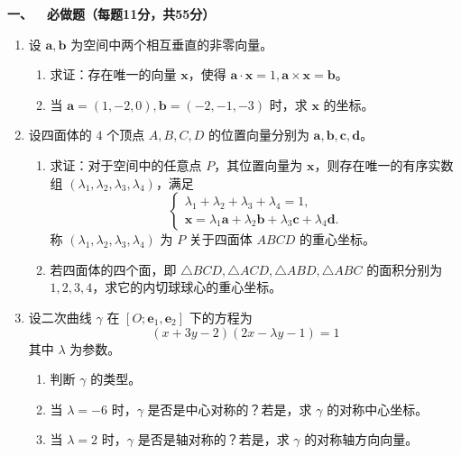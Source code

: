 \textbf{一、\ \ 必做题（每题11分，共55分）}
\begin{enumerate}
    \item 设 $\boldsymbol{a}, \boldsymbol{b}$ 为空间中两个相互垂直的非零向量。
    \begin{enumerate}
        \item[(a)] 求证：存在唯一的向量 $\boldsymbol{x}$，使得 $\boldsymbol{a}\cdot \boldsymbol{x}=1, \boldsymbol{a}\times \boldsymbol{x}=\boldsymbol{b}$。
        \item[(b)] 当 $\boldsymbol{a}=(1,-2,0), \boldsymbol{b}=(-2,-1,-3)$ 时，求 $\boldsymbol{x}$ 的坐标。
    \end{enumerate}

    \item 设四面体的 $4$ 个顶点 $A,B,C,D$ 的位置向量分别为 $\boldsymbol{a}, \boldsymbol{b}, \boldsymbol{c}, \boldsymbol{d}$。
    \begin{enumerate}
        \item[(a)] 求证：对于空间中的任意点 $P$，其位置向量为 $\boldsymbol{x}$，则存在唯一的有序实数组 $(\lambda_{1},\lambda_{2},\lambda_{3},\lambda_{4})$，满足
        \[
        \begin{cases}
        \lambda_{1}+\lambda_{2}+\lambda_{3}+\lambda_{4}=1, \\
        \boldsymbol{x}=\lambda_{1}\boldsymbol{a}+\lambda_{2}\boldsymbol{b}+\lambda_{3}\boldsymbol{c}+\lambda_{4}\boldsymbol{d}.
        \end{cases}
        \]
        称 $(\lambda_{1},\lambda_{2},\lambda_{3},\lambda_{4})$ 为 $P$ 关于四面体 $ABCD$ 的重心坐标。
        \item[(b)] 若四面体的四个面，即 $\triangle BCD, \triangle ACD, \triangle ABD, \triangle ABC$ 的面积分别为 $1, 2, 3, 4$，求它的内切球球心的重心坐标。
    \end{enumerate}

    \item 设二次曲线 $\gamma$ 在 $[O;\boldsymbol{e}_{1},\boldsymbol{e}_{2}]$ 下的方程为
    \[ (x+3y-2)(2x-\lambda y-1)=1 \]
    其中 $\lambda$ 为参数。
    \begin{enumerate}
        \item[(a)] 判断 $\gamma$ 的类型。
        \item[(b)] 当 $\lambda=-6$ 时，$\gamma$ 是否是中心对称的？若是，求 $\gamma$ 的对称中心坐标。
        \item[(c)] 当 $\lambda=2$ 时，$\gamma$ 是否是轴对称的？若是，求 $\gamma$ 的对称轴方向向量。
    \end{enumerate}


\end{enumerate}
